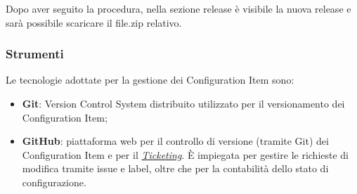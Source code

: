 Dopo aver seguito la procedura, nella sezione release è visibile la nuova release e sarà possibile scaricare il file.zip relativo.

\subsubsection{Strumenti}
Le tecnologie adottate per la gestione dei Configuration Item sono:
\begin{itemize}
    \item \textbf{Git}: Version Control System distribuito utilizzato per il versionamento dei Configuration Item;
    \item \textbf{GitHub}: piattaforma web per il controllo di versione (tramite Git) dei Configuration Item e per il \hyperlink{par:ticketing}{\textit{Ticketing}}. È impiegata per gestire le richieste di modifica tramite issue e label, oltre che per la contabilità dello stato di configurazione.
\end{itemize}

